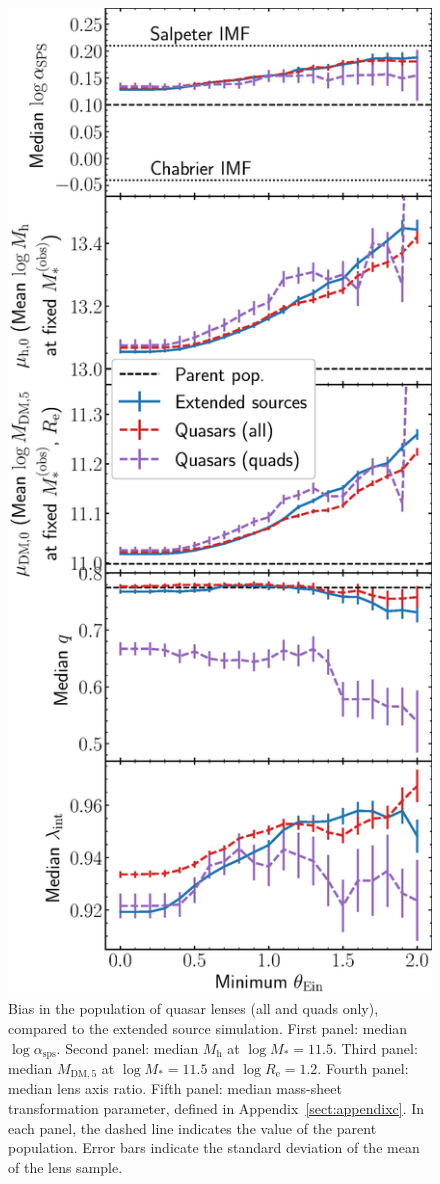 \documentclass{aa}
\def\reff{R_{\mathrm{e}}}
\def\mstar{M_*}
\def\asps{\alpha_{\mathrm{sps}}}
\def\mdmfive{M_{\mathrm{DM}, 5}}
\def\mhalo{M_{\mathrm{h}}}
\begin{document}
\begin{figure}
\includegraphics[width=\columnwidth]{quasar_bias.eps}
\caption{
Bias in the population of quasar lenses (all and quads only), compared to the extended source simulation.
First panel: median $\log{\asps}$.
Second panel: median $\mhalo$ at $\log{\mstar}=11.5$.
Third panel: median $\mdmfive$ at $\log{\mstar}=11.5$ and $\log{\reff}=1.2$.
Fourth panel: median lens axis ratio.
Fifth panel: median mass-sheet transformation parameter, defined in Appendix~\ref{sect:appendixc}.
In each panel, the dashed line indicates the value of the parent population.
Error bars indicate the standard deviation of the mean of the lens sample.
\label{fig:quasarbias}
}
\end{figure}
\end{document}
